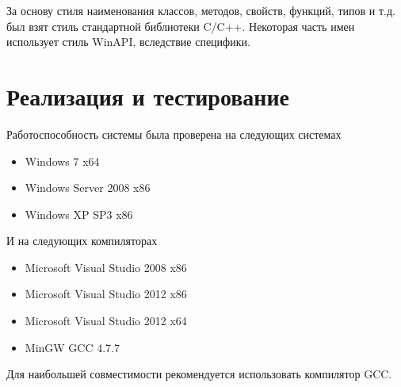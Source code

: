\documentclass{imcs}
\begin{document}
За основу стиля наименования классов, методов, свойств, функций, типов и т.д. был взят стиль стандартной библиотеки C/C++. Некоторая часть имен использует стиль WinAPI, вследствие специфики.

\section{Реализация и тестирование}

Работоспособность системы была проверена на следующих системах
\begin{itemize}

  \item Windows 7 x64
  \item Windows Server 2008 x86
  \item Windows XP SP3 x86
\end{itemize}
И на следующих компиляторах
\begin{itemize}
  \item Microsoft Visual Studio 2008 x86
  \item Microsoft Visual Studio 2012 x86
  \item Microsoft Visual Studio 2012 x64
  \item MinGW GCC 4.7.7
\end{itemize}
Для наибольшей совместимости рекомендуется использовать компилятор GCC.
\end{document}
